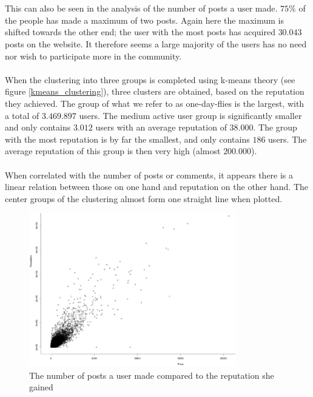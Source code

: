 \documentclass[conference]{IEEEtran}
\begin{document}
\\
\\
This can also be seen in the analysis of the number of posts a user made. $75\%$ of the people has made a maximum of two posts. Again here the maximum is shifted towards the other end; the user with the most posts has acquired $30.043$ posts on the website. It therefore seems a large majority of the users has no need nor wish to participate more in the community.
\\
\\
When the clustering into three groups is completed using k-means theory (see figure \ref{kmeans_clustering}), three clusters are obtained, based on the reputation they achieved. The group of what we refer to as one-day-flies is the largest, with a total of $3.469.897$ users. The medium active user group is significantly smaller and only contains $3.012$ users with an average reputation of $38.000$. The group with the most reputation is by far the smallest, and only contains $186$ users. The average reputation of this group is then very high (almost $200.000$).
\\
\\
When correlated with the number of posts or comments, it appears there is a linear relation between those on one hand and reputation on the other hand. The center groups of the clustering almost form one straight line when plotted.

\begin{figure}[h]
 \includegraphics[width=9cm]{Plots/answers_vs_rep.png}
 \caption{The number of posts a user made compared to the reputation she gained}
 \label{answers_vs_rep}
\end{figure}
\end{document}
